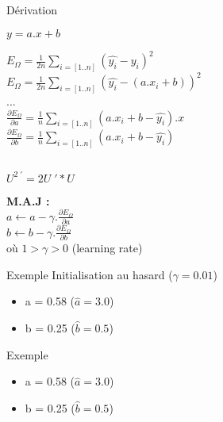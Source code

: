 \begin{frame}{Dérivation}
  \begin{minipage}[l]{0.49\linewidth}
    \begin{center}
      $\boxed{y = a.x+b}$ \\
    \end{center}
    $E_{\Omega} = \frac{1}{2n}\underset{i=[1..n]}{\sum}( \hat{y_i} - y_i )^2$ \\
    $E_{\Omega} = \frac{1}{2n}\underset{i=[1..n]}{\sum}( \hat{y_i} - (a.x_i+b) )^2$ \\
    ... \\
    $\frac{\partial{E_{\Omega}}}{\partial{a}} = \frac{1}{n}\sum_{i=[1..n]}(a.x_i+b - \hat{y_i}).x$ \\
    $\frac{\partial{E_{\Omega}}}{\partial{b}} = \frac{1}{n}\sum_{i=[1..n]}(a.x_i+b - \hat{y_i})$ \\
  \end{minipage}\hfill
  \begin{minipage}[c]{0.49\linewidth}
    $\;$ \\
    $\;$ \\
    $\;$ \\
    \begin{center}
      $\boxed{U^{2\;\prime}=2U\;'*U}$
    \end{center}
  \end{minipage}\hfill
  \begin{center}
    \textbf{M.A.J :} \\
    $\;$ \\
    $a \leftarrow a - \gamma.\frac{\partial{E_{\Omega}}}{\partial{a}}$ \\
    $b \leftarrow b - \gamma.\frac{\partial{E_{\Omega}}}{\partial{b}}$ \\
    $\;$ \\
    où $1 > \gamma > 0$ (learning rate)
  \end{center}
\end{frame}

\begin{frame}{Exemple}
  Initialisation au hasard ($\gamma = 0.01$)
  \begin{itemize}
    \item a = 0.58 ($\hat{a} = 3.0$)
    \item b = 0.25 ($\hat{b} = 0.5$)
  \end{itemize}
\end{frame}

\begin{frame}{Exemple}
  \begin{itemize}
    \item a = 0.58 ($\hat{a} = 3.0$)
    \item b = 0.25 ($\hat{b} = 0.5$)
  \end{itemize}
\end{frame}

